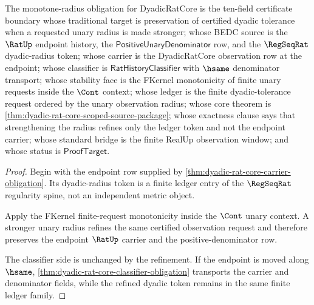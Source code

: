 \begin{theorem}
\label{thm:dyadic-rat-core-monotone-radius-obligation}
The monotone-radius obligation for DyadicRatCore is the ten-field certificate
boundary whose traditional target is preservation of certified dyadic
tolerance when a requested unary radius is made stronger; whose BEDC source is
the $\RatUp$ endpoint history, the
$\mathsf{PositiveUnaryDenominator}$ row, and the $\RegSeqRat$ dyadic-radius
token; whose carrier is the DyadicRatCore observation row at the endpoint;
whose classifier is $\mathsf{RatHistoryClassifier}$ with $\hsame$ denominator
transport; whose stability face is the FKernel monotonicity of finite unary
requests inside the $\Cont$ context; whose ledger is the finite
dyadic-tolerance request ordered by the unary observation radius; whose core
theorem is \autoref{thm:dyadic-rat-core-scoped-source-package}; whose
exactness clause says that strengthening the radius refines only the ledger
token and not the endpoint carrier; whose standard bridge is the finite
RealUp observation window; and whose status is $\mathsf{ProofTarget}$.
\end{theorem}
\begin{proof}
Begin with the endpoint row supplied by
\autoref{thm:dyadic-rat-core-carrier-obligation}. Its dyadic-radius token is a
finite ledger entry of the $\RegSeqRat$ regularity spine, not an independent
metric object.

Apply the FKernel finite-request monotonicity inside the $\Cont$ unary
context. A stronger unary radius refines the same certified observation
request and therefore preserves the endpoint $\RatUp$ carrier and the
positive-denominator row.

The classifier side is unchanged by the refinement. If the endpoint is moved
along $\hsame$, \autoref{thm:dyadic-rat-core-classifier-obligation} transports
the carrier and denominator fields, while the refined dyadic token remains in
the same finite ledger family.
\end{proof}

